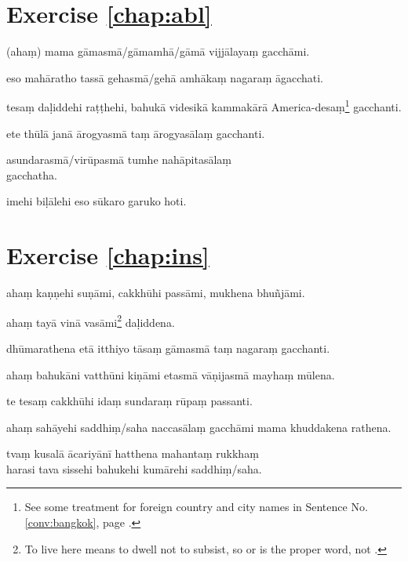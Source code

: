 \section*{Exercise \ref{chap:abl}}
\begin{answerkey}
\item (aha\d m) mama g\=amasm\=a/g\=amamh\=a/g\=am\=a vijj\=alaya\d m gacch\=ami.
\item eso mah\=aratho tass\=a gehasm\=a/geh\=a amh\=aka\d m nagara\d m \=agacchati.
\item tesa\d m da\d liddehi ra\d t\d thehi, bahuk\=a videsik\=a kammak\=ar\=a Ame\-rica-desa\d m\footnote{See some treatment for foreign country and city names in Sentence No.\,\ref{conv:bangkok}, page \pageref{conv:bangkok}.} gacchanti.
\item ete th\=ul\=a jan\=a \=arogyasm\=a ta\d m \=arogyas\=ala\d m gacchanti.
\item asundarasm\=a/vir\=upasm\=a tumhe nah\=apitas\=ala\d m \\gacchatha.
\item imehi bi\d l\=alehi eso s\=ukaro garuko hoti.
\end{answerkey}

\section*{Exercise \ref{chap:ins}}
\begin{answerkey}
\item aha\d m ka\d n\d nehi su\d n\=ami, cakkh\=uhi pass\=ami, mukhena bhu\~nj\=ami.
\item aha\d m tay\=a vin\=a vas\=ami\footnote{To live here means to dwell not to subsist, so  or  is the proper word, not .} da\d liddena.
\item dh\=umarathena et\=a itthiyo t\=asa\d m g\=amasm\=a ta\d m nagara\d m gacchanti.
\item aha\d m bahuk\=ani vatth\=uni ki\d n\=ami etasm\=a v\=a\d nijasm\=a mayha\d m m\=ulena.
\item te tesa\d m cakkh\=uhi ida\d m sundara\d m r\=upa\d m passanti.
\item aha\d m sah\=ayehi saddhi\d m/saha naccas\=ala\d m gacch\=ami mama khuddakena rathena.
\item tva\d m kusal\=a \=acariy\=an\=i hatthena mahanta\d m rukkha\d m \\harasi tava sissehi bahukehi kum\=arehi saddhi\d m/saha.
\end{answerkey}


